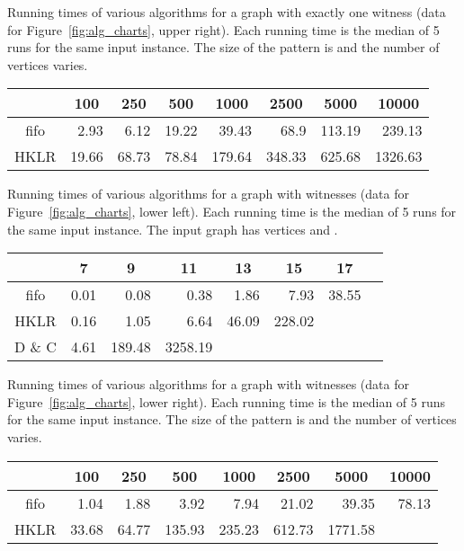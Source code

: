 \documentclass[11pt]{article}
\begin{document}
Running times of various algorithms for a graph with exactly one witness (data for Figure~\ref{fig:alg_charts}, upper right).
Each running time is the median of 5 runs for the same input instance.
The size of the pattern is  and the number of vertices  varies.

{\scriptsize
\begin{center}
\begin{tabular}{|c|r|r|r|r|r|r|r|}\hline
\multicolumn{1}{|c|}{} & \multicolumn{1}{|c|}{100}  & \multicolumn{1}{|c|}{250}  & \multicolumn{1}{|c|}{500}  & \multicolumn{1}{|c|}{1000}  & \multicolumn{1}{|c|}{2500}  & \multicolumn{1}{|c|}{5000}  & \multicolumn{1}{|c|}{10000} \\\hline
fifo & 2.93 & 6.12 & 19.22 & 39.43 & 68.9 & 113.19 & 239.13\\
HKLR & 19.66 & 68.73 & 78.84 & 179.64 & 348.33 & 625.68 & 1326.63\\\hline
\end{tabular}
\end{center}
}

Running times of various algorithms for a graph with  witnesses (data for Figure~\ref{fig:alg_charts}, lower left).
Each running time is the median of 5 runs for the same input instance.
The input graph has  vertices and .


{\scriptsize
\begin{center}
\begin{tabular}{|c|r|r|r|r|r|r|r|}\hline
\multicolumn{1}{|c|}{} & \multicolumn{1}{|c|}{7}  & \multicolumn{1}{|c|}{9}  & \multicolumn{1}{|c|}{11}  & \multicolumn{1}{|c|}{13}  & \multicolumn{1}{|c|}{15}  & \multicolumn{1}{|c|}{17} \\\hline
fifo & 0.01 & 0.08 & 0.38 & 1.86 & 7.93 & 38.55\\
HKLR & 0.16 & 1.05 & 6.64 & 46.09 & 228.02 & \\
D \& C & 4.61 & 189.48 & 3258.19& & &\\\hline
\end{tabular}
\end{center}
}

Running times of various algorithms for a graph with  witnesses (data for Figure~\ref{fig:alg_charts}, lower right).
Each running time is the median of 5 runs for the same input instance.
The size of the pattern is  and the number of vertices  varies.



{\scriptsize
\begin{center}
\begin{tabular}{|c|r|r|r|r|r|r|r|}\hline
\multicolumn{1}{|c|}{} & \multicolumn{1}{|c|}{100}  & \multicolumn{1}{|c|}{250}  & \multicolumn{1}{|c|}{500}  & \multicolumn{1}{|c|}{1000}  & \multicolumn{1}{|c|}{2500}  & \multicolumn{1}{|c|}{5000}  & \multicolumn{1}{|c|}{10000} \\\hline
fifo & 1.04 & 1.88 & 3.92 & 7.94 & 21.02 & 39.35 & 78.13\\
HKLR & 33.68 & 64.77 & 135.93 & 235.23 & 612.73 & 1771.58 &\\\hline
\end{tabular}
\end{center}
}
\end{document}

